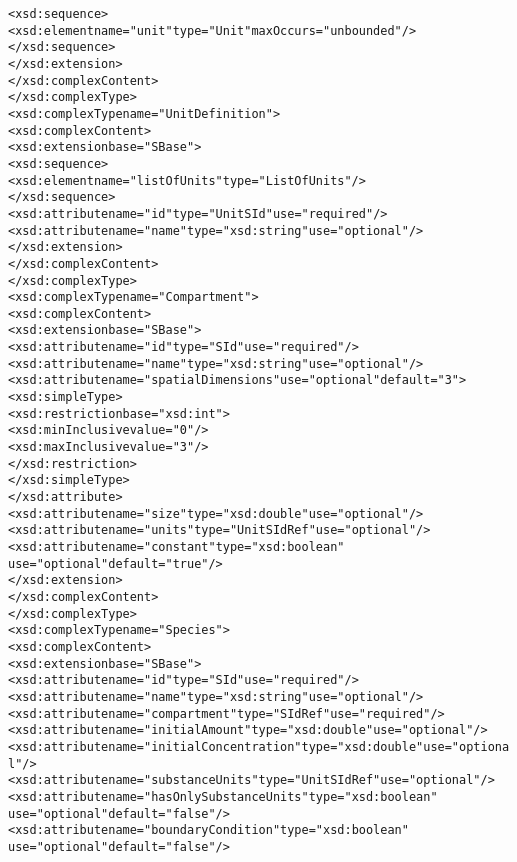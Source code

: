 \begin{alltt}
                <xsd:sequence>
                    <xsd:element name="unit" type="Unit" maxOccurs="unbounded"/>
                </xsd:sequence>
            </xsd:extension>
        </xsd:complexContent>
    </xsd:complexType>
    <xsd:complexType name="UnitDefinition">
        <xsd:complexContent>
            <xsd:extension base="SBase">
                <xsd:sequence>
                    <xsd:element name="listOfUnits" type="ListOfUnits"/>
                </xsd:sequence>
                <xsd:attribute name="id" type="UnitSId" use="required"/>
                <xsd:attribute name="name" type="xsd:string" use="optional"/>
            </xsd:extension>
        </xsd:complexContent>
    </xsd:complexType>
    <xsd:complexType name="Compartment">
        <xsd:complexContent>
            <xsd:extension base="SBase">
                <xsd:attribute name="id" type="SId" use="required"/>
                <xsd:attribute name="name" type="xsd:string" use="optional"/>
                <xsd:attribute name="spatialDimensions" use="optional" default="3">
                    <xsd:simpleType>
                        <xsd:restriction base="xsd:int">
                            <xsd:minInclusive value="0"/>
                            <xsd:maxInclusive value="3"/>
                        </xsd:restriction>
                    </xsd:simpleType>
                </xsd:attribute>
                <xsd:attribute name="size" type="xsd:double" use="optional"/>
                <xsd:attribute name="units" type="UnitSIdRef" use="optional"/>
                <xsd:attribute name="constant" type="xsd:boolean" 
                               use="optional" default="true"/>
            </xsd:extension>
        </xsd:complexContent>
    </xsd:complexType>
    <xsd:complexType name="Species">
        <xsd:complexContent>
            <xsd:extension base="SBase">
                <xsd:attribute name="id" type="SId" use="required"/>
                <xsd:attribute name="name" type="xsd:string" use="optional"/>
                <xsd:attribute name="compartment" type="SIdRef" use="required"/>
                <xsd:attribute name="initialAmount" type="xsd:double" use="optional"/>
                <xsd:attribute name="initialConcentration" type="xsd:double" use="optional"/>
                <xsd:attribute name="substanceUnits" type="UnitSIdRef" use="optional"/>
                <xsd:attribute name="hasOnlySubstanceUnits" type="xsd:boolean" 
                               use="optional" default="false"/>
                <xsd:attribute name="boundaryCondition" type="xsd:boolean" 
                               use="optional" default="false"/>

\end{alltt}
